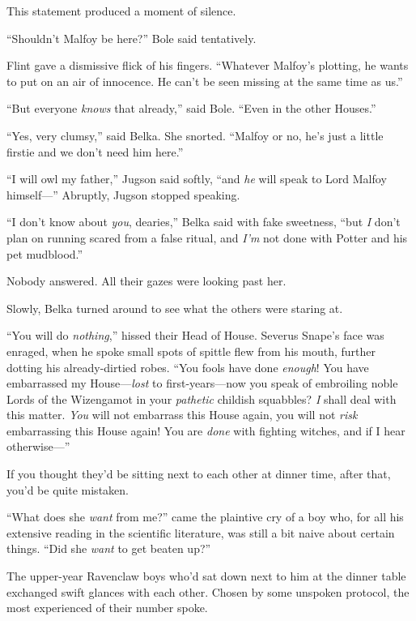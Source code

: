 This statement produced a moment of silence.

“Shouldn’t Malfoy be here?” Bole said tentatively.

Flint gave a dismissive flick of his fingers.
“Whatever Malfoy’s plotting, he wants to put on an air of innocence. He can’t be seen missing at the same time as us.”

“But everyone \emph{knows} that already,” said Bole.
“Even in the other Houses.”

“Yes, very clumsy,” said Belka. She snorted.
“Malfoy or no, he’s just a little firstie and we don’t need him here.”

“I will owl my father,” Jugson said softly, “and \emph{he} will speak to Lord Malfoy himself—” Abruptly, Jugson stopped speaking.

“I don’t know about \emph{you}, dearies,” Belka said with fake sweetness, “but \emph{I} don’t plan on running scared from a false ritual, and \emph{I’m} not done with Potter and his pet mudblood.”

Nobody answered. All their gazes were looking past her.

Slowly, Belka turned around to see what the others were staring at.

“You will do \emph{nothing},” hissed their Head of House. Severus Snape’s face was enraged, when he spoke small spots of spittle flew from his mouth, further dotting his already-dirtied robes.
“You fools have done \emph{enough}! You have embarrassed my House—\emph{lost} to first-years—now you speak of embroiling noble Lords of the Wizengamot in your \emph{pathetic} childish squabbles? \emph{I} shall deal with this matter. \emph{You} will not embarrass this House again, you will not \emph{risk} embarrassing this House again! You are \emph{done} with fighting witches, and if I hear otherwise—”

\later

If you thought they’d be sitting next to each other at dinner time, after that, you’d be quite mistaken.

“What does she \emph{want} from me?” came the plaintive cry of a boy who, for all his extensive reading in the scientific literature, was still a bit naive about certain things.
“Did she \emph{want} to get beaten up?”

The upper-year Ravenclaw boys who’d sat down next to him at the dinner table exchanged swift glances with each other. Chosen by some unspoken protocol, the most experienced of their number spoke.

